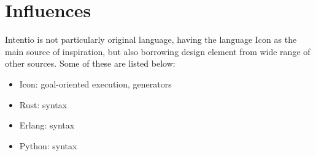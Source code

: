 \chapter{Influences}

Intentio is not particularly original language, having the language Icon as the main source of inspiration, but also borrowing design element from wide range of other sources. Some of these are listed below:

\begin{itemize}
 \item Icon\cite{TheIconProgrammingLanguage}: goal-oriented execution, generators
 \item Rust\cite{TheRustProgrammingLanguage}: syntax
 \item Erlang\cite{TheErlangProgrammingLanguage}: syntax
 \item Python\cite{ThePythonProgrammingLanguage}: syntax
\end{itemize}
